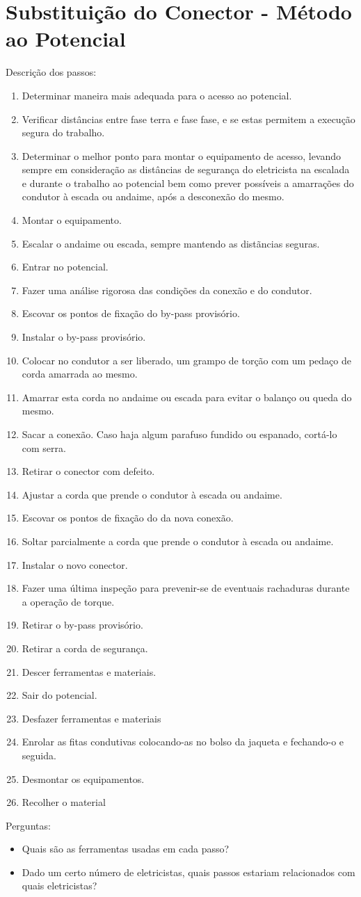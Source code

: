 \section{Substituição do Conector - Método ao Potencial}

Descrição dos passos:

\begin{enumerate}
\item Determinar maneira mais adequada para o acesso ao potencial.
\item Verificar distâncias entre fase terra e fase fase, e se estas permitem a execução segura do trabalho.
\item Determinar o melhor ponto para montar o equipamento de acesso, levando sempre em consideração as distâncias de segurança do eletricista na escalada e durante o trabalho ao potencial bem como prever possíveis a amarrações do condutor à escada ou andaime, após a desconexão do mesmo.
\item Montar o equipamento.
\item Escalar o andaime ou escada, sempre mantendo as distãncias seguras.
\item Entrar no potencial.
\item Fazer uma análise rigorosa das condições da conexão e do condutor.
\item Escovar os pontos de fixação do by-pass provisório.
\item Instalar o by-pass provisório.
\item Colocar no condutor a ser liberado, um grampo de torção com um pedaço de corda amarrada ao mesmo.
\item Amarrar esta corda no andaime ou escada para evitar o balanço ou queda do mesmo.
\item Sacar a conexão. Caso haja algum parafuso fundido ou espanado, cortá-lo com serra.
\item Retirar o conector com defeito.
\item Ajustar a corda que prende o condutor à escada ou andaime.
\item Escovar os pontos de fixação do da nova conexão.
\item Soltar parcialmente a corda que prende o condutor à escada ou andaime.
\item Instalar o novo conector.
\item Fazer uma última inspeção para prevenir-se de eventuais rachaduras durante a operação de torque.
\item Retirar o by-pass provisório.
\item Retirar a corda de segurança.
\item Descer ferramentas e materiais.
\item Sair do potencial.
\item Desfazer ferramentas e materiais
\item Enrolar as fitas condutivas colocando-as no bolso da jaqueta e fechando-o e seguida.
\item Desmontar os equipamentos.
\item Recolher o material
\end{enumerate}

Perguntas: 
\begin{itemize}
\item Quais são as ferramentas usadas em cada passo?
\item Dado um certo número de eletricistas, quais passos estariam relacionados com quais eletricistas?
\end{itemize}